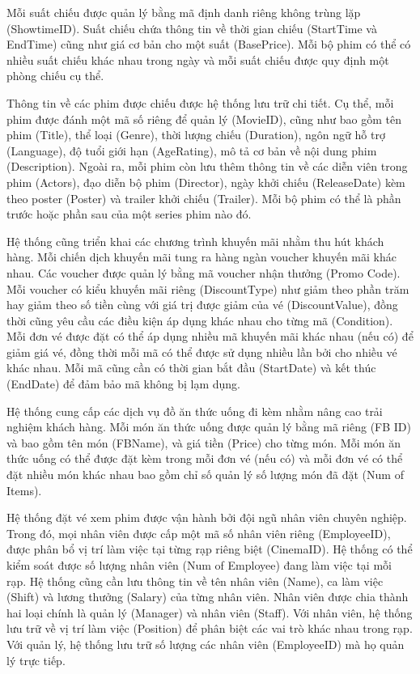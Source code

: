 \documentclass[a4paper]{article}
\begin{document}
Mỗi suất chiếu được quản lý bằng mã định danh riêng không trùng lặp (ShowtimeID). 
Suất chiếu chứa thông tin về thời gian chiếu (StartTime và EndTime) cũng như giá cơ bản cho một suất (BasePrice). 
Mỗi bộ phim có thể có nhiều suất chiếu khác nhau trong ngày và mỗi suất chiếu được quy định một phòng chiếu cụ thể.

Thông tin về các phim được chiếu được hệ thống lưu trữ chi tiết. 
Cụ thể, mỗi phim được đánh một mã số riêng để quản lý (MovieID), cũng như bao gồm tên phim (Title), thể loại (Genre), thời lượng chiếu (Duration), ngôn ngữ hỗ trợ (Language), độ tuổi giới hạn (AgeRating), mô tả cơ bản về nội dung phim (Description). 
Ngoài ra, mỗi phim còn lưu thêm thông tin về các diễn viên trong phim (Actors), đạo diễn bộ phim (Director), ngày khởi chiếu (ReleaseDate) kèm theo poster (Poster) và trailer khởi chiếu (Trailer). 
Mỗi bộ phim có thể là phần trước hoặc phần sau của một series phim nào đó. 

Hệ thống cũng triển khai các chương trình khuyến mãi nhằm thu hút khách hàng. 
Mỗi chiến dịch khuyến mãi tung ra hàng ngàn voucher khuyến mãi khác nhau. 
Các voucher được quản lý bằng mã voucher nhận thưởng (Promo Code). 
Mỗi voucher có kiểu khuyến mãi riêng (DiscountType) như giảm theo phần trăm hay giảm theo số tiền cùng với giá trị được giảm của vé (DiscountValue), đồng thời cũng yêu cầu các điều kiện áp dụng khác nhau cho từng mã (Condition). 
Mỗi đơn vé được đặt có thể áp dụng nhiều mã khuyến mãi khác nhau (nếu có) để giảm giá vé, đồng thời mỗi mã có thể được sử dụng nhiều lần bởi cho nhiều vé khác nhau. 
Mỗi mã cũng cần có thời gian bắt đầu (StartDate) và kết thúc (EndDate) để đảm bảo mã không bị lạm dụng.

Hệ thống cung cấp các dịch vụ đồ ăn thức uống đi kèm nhằm nâng cao trải nghiệm khách hàng. 
Mỗi món ăn thức uống được quản lý bằng mã riêng (FB ID) và bao gồm tên món (FBName), và giá tiền (Price) cho từng món.
Mỗi món ăn thức uống có thể được đặt kèm trong mỗi đơn vé (nếu có) và mỗi đơn vé có thể đặt nhiều món khác nhau bao gồm chỉ số quản lý số lượng món đã đặt (Num of Items). 

Hệ thống đặt vé xem phim được vận hành bởi đội ngũ nhân viên chuyên nghiệp. 
Trong đó, mọi nhân viên được cấp một mã số nhân viên riêng (EmployeeID), được phân bổ vị trí làm việc tại từng rạp riêng biệt (CinemaID). 
Hệ thống có thể kiểm soát được số lượng nhân viên (Num of Employee) đang làm việc tại mỗi rạp.
Hệ thống cũng cần lưu thông tin về tên nhân viên (Name), ca làm việc (Shift) và lương thưởng (Salary) của từng nhân viên. 
Nhân viên được chia thành hai loại chính là quản lý (Manager) và nhân viên (Staff). 
Với nhân viên, hệ thống lưu trữ về vị trí làm việc (Position) để phân biệt các vai trò khác nhau trong rạp.
Với quản lý, hệ thống lưu trữ số lượng các nhân viên (EmployeeID) mà họ quản lý trực tiếp. 
\end{document}
